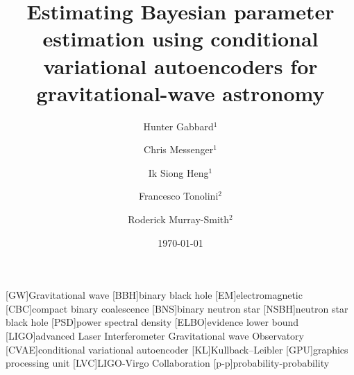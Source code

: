 \documentclass[%
showpacs,
 amsmath,amssymb,
 aps,
 twocolumn,
 prl,
 reprint,
floatfix,
]{revtex4-1}
\begin{document}

\title{Estimating Bayesian parameter estimation using conditional variational
autoencoders for gravitational-wave astronomy}

\author{Hunter Gabbard$^1$}
\author{Chris Messenger$^1$}
\author{Ik Siong Heng$^1$}
\author{Francesco Tonolini$^2$}
\author{Roderick Murray-Smith$^2$}


\date{\today}

\maketitle

%

[GW]{Gravitational wave}
[BBH]{binary black hole}
[EM]{electromagnetic}
[CBC]{compact binary coalescence}
[BNS]{binary neutron star}
[NSBH]{neutron star black hole}
[PSD]{power spectral density}
[ELBO]{evidence lower bound}
[LIGO]{advanced Laser Interferometer Gravitational wave Observatory}
[CVAE]{conditional variational autoencoder}
[KL]{Kullback–Leibler}
[GPU]{graphics processing unit}
[LVC]{LIGO-Virgo Collaboration}
[p-p]{probability-probability}
\end{document}
